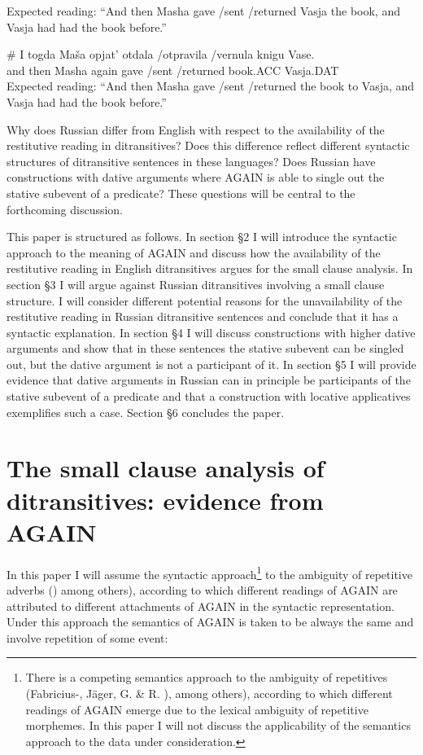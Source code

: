 \documentclass[output=paper,modfonts,nonflat,
 hidelinks
]{langsci/langscibook}
\begin{document}
\glt Expected reading: “And then Masha gave /sent /returned Vasja the book, and Vasja had had the book before.”

\ex
\gll     \# I togda Maša opjat’ otdala /otpravila /vernula knigu Vase.\\
 and then Masha again gave /sent /returned book.ACC Vasja.DAT\\
\glt Expected reading: “And then Masha gave /sent /returned the book to Vasja, and Vasja had had the book before.”
\z
\z


{Why does Russian differ from English with respect to the availability of the restitutive reading in ditransitives? Does this difference reflect different syntactic structures of ditransitive sentences in these languages? Does Russian have constructions with dative arguments where} {AGAIN}{ is able to single out the stative subevent of a predicate? These questions will be central to the forthcoming discussion.}



This paper is structured as follows. In section §2 I will introduce the syntactic approach to the meaning of AGAIN and discuss how the availability of the restitutive reading in English ditransitives argues for the small clause analysis. In section §3 I will argue against Russian ditransitives involving a small clause structure. I will consider different potential reasons for the unavailability of the restitutive reading in Russian ditransitive sentences and conclude that it has a syntactic explanation. In section §4 I will discuss constructions with higher dative arguments and show that in these sentences the stative subevent can be singled out, but the dative argument is not a participant of it. In section §5 I will provide evidence that dative arguments in Russian can in principle be participants of the stative subevent of a predicate and that a construction with locative applicatives exemplifies such a case. Section §6 concludes the paper.


\section{The small clause analysis of ditransitives: evidence from AGAIN}

In this paper I will assume the syntactic approach\footnote{There is a competing semantics approach to the ambiguity of repetitives (Fabricius-\citealt{Hansen2001}, Jäger, G. \& R. \citealt{Blutner2000}), among others), according to which different readings of AGAIN emerge due to the lexical ambiguity of repetitive morphemes. In this paper I will not discuss the applicability of the semantics approach to the data under consideration.} to the ambiguity of repetitive adverbs (\citealt{vonStechow1996,BeckJohnson2004,Beck2005,AlexiadouEtAl2014,LechnerEtAl2015}) among others), according to which different readings of AGAIN are attributed to different attachments of AGAIN in the syntactic representation. Under this approach the semantics of AGAIN is taken to be always the same and involve repetition of some event:
\end{document}

